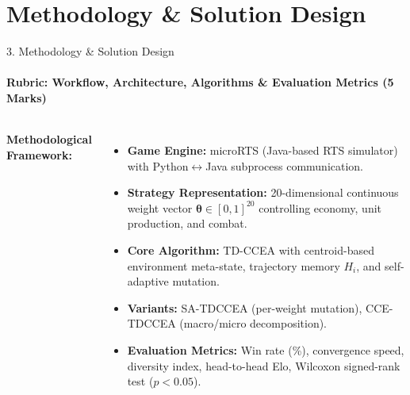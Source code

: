 \documentclass[aspectratio=169, 11pt]{beamer}
\begin{document}
\section{Methodology \& Solution Design}
\begin{frame}{3. Methodology \& Solution Design}
    \framesubtitle{Rubric: Workflow, Architecture, Algorithms \& Evaluation Metrics (5 Marks)}

    \begin{columns}[T]
        \textbf{\textcolor{amritaMaroon}{Methodological Framework:}}
        \begin{itemize}\small
            \item \textbf{Game Engine:} microRTS (Java-based RTS simulator) with Python$\leftrightarrow$Java subprocess communication.
            \item \textbf{Strategy Representation:} 20-dimensional continuous weight vector $\boldsymbol{\theta} \in [0,1]^{20}$ controlling economy, unit production, and combat.
            \item \textbf{Core Algorithm:} TD-CCEA with centroid-based environment meta-state, trajectory memory $H_i$, and self-adaptive mutation.
            \item \textbf{Variants:} SA-TDCCEA (per-weight mutation), CCE-TDCCEA (macro/micro decomposition).
            \item \textbf{Evaluation Metrics:} Win rate (\%), convergence speed, diversity index, head-to-head Elo, Wilcoxon signed-rank test ($p < 0.05$).
        \end{itemize}


\end{columns}
\end{frame}
\end{document}
